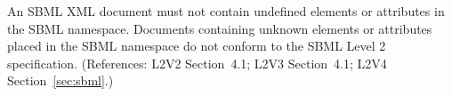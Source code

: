 An SBML XML document must not contain undefined elements or
attributes in the SBML namespace.  Documents containing unknown
elements or attributes placed in the SBML namespace do not conform
to the SBML Level 2 specification.  (References: L2V2 Section~4.1;
L2V3 Section~4.1; L2V4 Section~\ref{sec:sbml}.)

